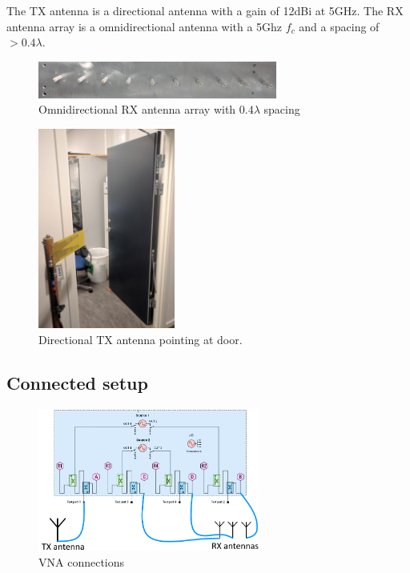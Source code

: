 The TX antenna is a directional antenna with a gain of 12dBi at 5GHz.
The RX antenna array is a omnidirectional antenna with a 5Ghz $f_c$ and a spacing of $>0.4 \lambda$.
\begin{figure}[H]
\centering
\includegraphics[width=0.7\textwidth]{pictures/Measurement/antenna_array.jpg}
    \caption{Omnidirectional RX antenna array with $0.4 \lambda$ spacing}
\end{figure}
\begin{figure}[H]
\centering
\includegraphics[width=0.4\textwidth]{pictures/Measurement/antenna_door.jpg}
\caption{Directional TX antenna pointing at door.}
\end{figure}


\label{equip}
\subsection{Connected setup}

\begin{figure}[H]
\centering
\includegraphics[width=0.65\textwidth]{figures/Gimp_figures/4portVNA.png}
\caption{VNA connections}
\label{connection_diagram}
\end{figure}


